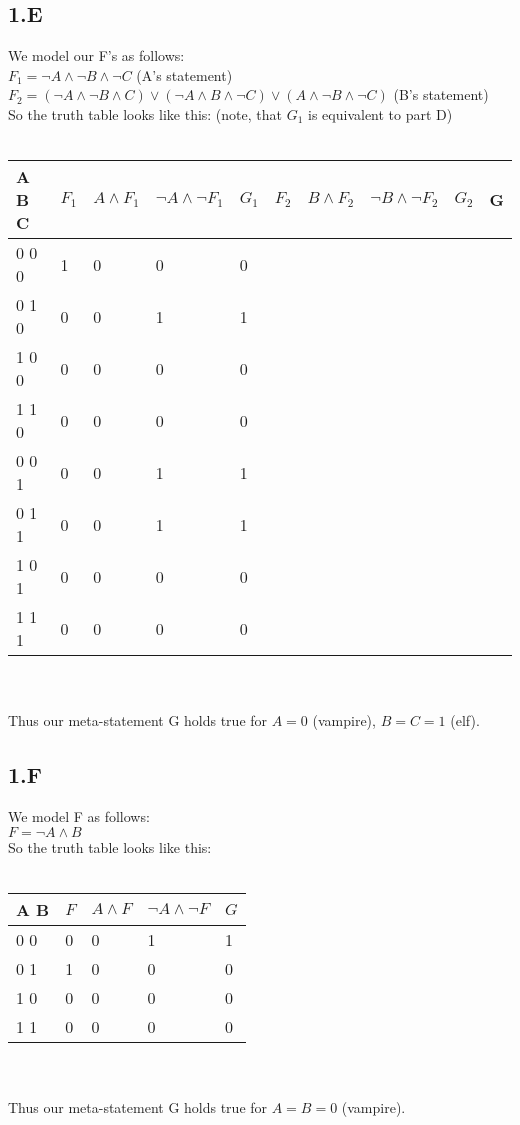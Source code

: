 \documentclass[12pt]{article}
\begin{document}
\subsection*{1.E}
We model our F's as follows:\\
$F_1 = \neg A \land \neg B \land \neg C$ (A's statement)\\	
$F_2 = (\neg A \land \neg B \land C) \lor (\neg A \land B \land \neg C) \lor (A \land \neg B \land \neg C)$ (B's statement) \\%
So the truth table looks like this: (note, that $G_1$ is equivalent to part D)\\\\
\begin{tabular}{  l | l | l | l | l | l | l | l | l | l}
	A B C & $F_1$ & $A \land F_1 $ & $\neg A \land \neg F_1$ & $G_1$ & $F_2$ & $B \land F_2 $ & $\neg B \land \neg F_2$ & $G_2$ & G\\ \hline
	0 0 0 & 1 & 0 & 0 & 0 &  &  &  &  &  \\
	0 1 0 & 0 & 0 & 1 & 1 &  &  &  &  &  \\
	1 0 0 & 0 & 0 & 0 & 0 &  &  &  &  &  \\
	1 1 0 & 0 & 0 & 0 & 0 &  &  &  &  &  \\
	0 0 1 & 0 & 0 & 1 & 1 &  &  &  &  &  \\
	0 1 1 & 0 & 0 & 1 & 1 &  &  &  &  &  \\
	1 0 1 & 0 & 0 & 0 & 0 &  &  &  &  &  \\
	1 1 1 & 0 & 0 & 0 & 0 &  &  &  &  &  \\
\end{tabular} \\\\
Thus our meta-statement G holds true for $A=0$ (vampire), $B=C=1$ (elf).

\subsection*{1.F}

We model F as follows:\\
$F = \neg A \land B$ \\
So the truth table looks like this:\\\\
\begin{tabular}{  l | l | l | l | l}
	A B & $F$ & $A \land F $ & $\neg A \land \neg F$ & $G$ \\ \hline
	0 0 & 0 & 0 & 1 & 1 \\
	0 1 & 1 & 0 & 0 & 0 \\
	1 0 & 0 & 0 & 0 & 0 \\
	1 1 & 0 & 0 & 0 & 0 \\
\end{tabular} \\\\
Thus our meta-statement G holds true for $A=B=0$ (vampire).
\end{document}
